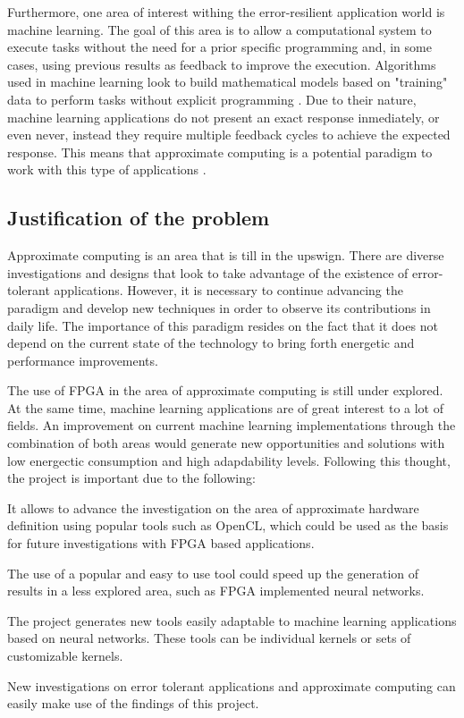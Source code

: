 Furthermore, one area of interest withing the error-resilient application world is machine learning.
The goal of this area is to allow a computational system to execute tasks without the need for a prior
specific programming and, in some cases, using previous results as feedback to improve the execution.
Algorithms used in machine learning look to build mathematical models based on "training" data to perform
tasks without explicit programming \cite{patternrecogbook}. Due to their nature, machine learning applications do not present
an exact response inmediately, or even never, instead they require multiple feedback cycles to achieve
the expected response. This means that approximate computing is a potential paradigm to work with this
type of applications \cite{approximatecomp}.

\subsection{Justification of the problem}

Approximate computing is an area that is till in the upswign. There are diverse investigations and designs
that look to take advantage of the existence of error-tolerant applications. However, it is necessary to
continue advancing the paradigm and develop new techniques in order to observe its contributions in daily
life. The importance of this paradigm resides on the fact that it does not depend on the current state
of the technology to bring forth energetic and performance improvements.

The use of FPGA in the area of approximate computing is still under explored. At the same time, machine
learning applications are of great interest to a lot of fields. An improvement on current machine learning
implementations through the combination of both areas would generate new opportunities and solutions
with low energectic consumption and high adapdability levels. Following this thought, the project is
important due to the following:

\begin{compactitem}
    \item It allows to advance the investigation on the area of approximate hardware definition
    using popular tools such as OpenCL, which could be used as the basis for future investigations
    with FPGA based applications.
    \item The use of a popular and easy to use tool could speed up the generation of results in a
    less explored area, such as FPGA implemented neural networks.
    \item The project generates new tools easily adaptable to machine learning applications based
    on neural networks. These tools can be individual kernels or sets of customizable kernels. 
    \item New investigations on error tolerant applications and approximate computing can easily 
    make use of the findings of this project.
\end{compactitem}


